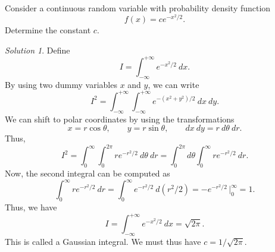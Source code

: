 \documentclass[11pt]{article}
\theoremstyle{definition}
\theoremstyle{remark}
\newtheorem*{solution}{Solution}
\numberwithin{equation}{module}
\begin{document}
    \begin{exercise}
        Consider a continuous random variable with probability density function \[
            f(x) = c e^{-x^2 /2}.
        \] Determine the constant $c$.
        \begin{solution}
            Define \[
                I = \int_{-\infty}^{+\infty} e^{-x^2 /2} \:dx.
            \] By using two dummy variables $x$ and $y$, we can write \[
                I^2 = \int_{-\infty}^{+\infty} \int_{-\infty}^{+\infty} e^{-(x^2 +
                y^2) / 2}\:dx\:dy.
            \] We can shift to polar coordinates by using the transformations \[
                x = r\cos\theta, \qquad y = r\sin\theta, \qquad dx\:dy =
                r\:d\theta\:dr.
            \] Thus, \[
                I^2 = \int_{0}^\infty \int_{0}^{2\pi} re^{-r^2 / 2}\:d\theta\:dr =
                \int_0^{2\pi} d\theta \int_0^\infty re^{-r^2 / 2}\:dr.
            \] Now, the second integral can be computed as \[
                \int_0^\infty re^{-r^2 / 2}\:dr = \int_0^\infty e^{-r^2 / 2} \:d(r^2
                / 2) = -e^{-r^2 / 2}\,\Big|_0^\infty = 1.
            \] Thus, we have \[
                I = \int_{-\infty}^{+\infty} e^{-x^2 / 2} \:dx = \sqrt{2\pi}.
            \] This is called a Gaussian integral. We must thus have $c = 1
            /\sqrt{2\pi}$.
        \end{solution}
    \end{exercise}
\end{document}
